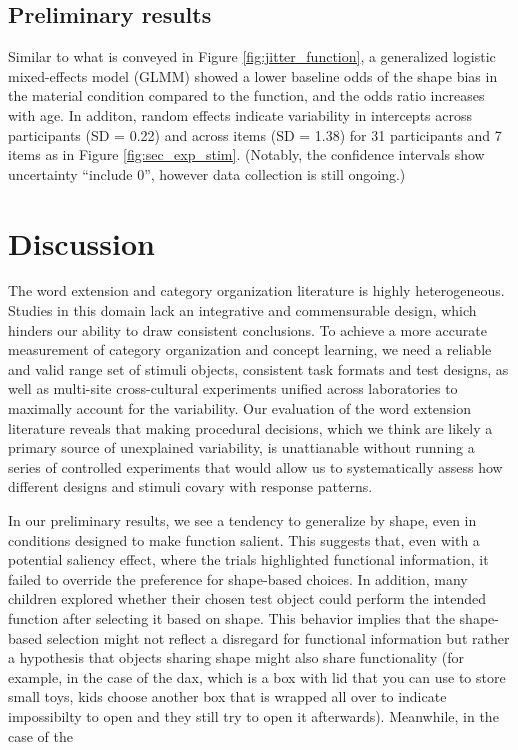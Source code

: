 \documentclass[10pt, letterpaper]{article}
\begin{document}
\hypertarget{preliminary-results}{%
\subsection{Preliminary results}\label{preliminary-results}}

Similar to what is conveyed in Figure \ref{fig:jitter_function}, a
generalized logistic mixed-effects model (GLMM) showed a lower baseline
odds of the shape bias in the material condition compared to the
function, and the odds ratio increases with age. In additon, random
effects indicate variability in intercepts across participants (SD =
0.22) and across items (SD = 1.38) for 31 participants and 7 items as in
Figure \ref{fig:sec_exp_stim}. (Notably, the confidence intervals show
uncertainty ``include 0'', however data collection is still ongoing.)

\hypertarget{discussion-1}{%
\section{Discussion}\label{discussion-1}}

The word extension and category organization literature is highly
heterogeneous. Studies in this domain lack an integrative and
commensurable design, which hinders our ability to draw consistent
conclusions. To achieve a more accurate measurement of category
organization and concept learning, we need a reliable and valid range
set of stimuli objects, consistent task formats and test designs, as
well as multi-site cross-cultural experiments unified across
laboratories to maximally account for the variability. Our evaluation of
the word extension literature reveals that making procedural decisions,
which we think are likely a primary source of unexplained variability,
is unattianable without running a series of controlled experiments that
would allow us to systematically assess how different designs and
stimuli covary with response patterns.

In our preliminary results, we see a tendency to generalize by shape,
even in conditions designed to make function salient. This suggests
that, even with a potential saliency effect, where the trials
highlighted functional information, it failed to override the preference
for shape-based choices. In addition, many children explored whether
their chosen test object could perform the intended function after
selecting it based on shape. This behavior implies that the shape-based
selection might not reflect a disregard for functional information but
rather a hypothesis that objects sharing shape might also share
functionality (for example, in the case of the dax, which is a box with
lid that you can use to store small toys, kids choose another box that
is wrapped all over to indicate impossibilty to open and they still try
to open it afterwards). Meanwhile, in the case of the
\end{document}

